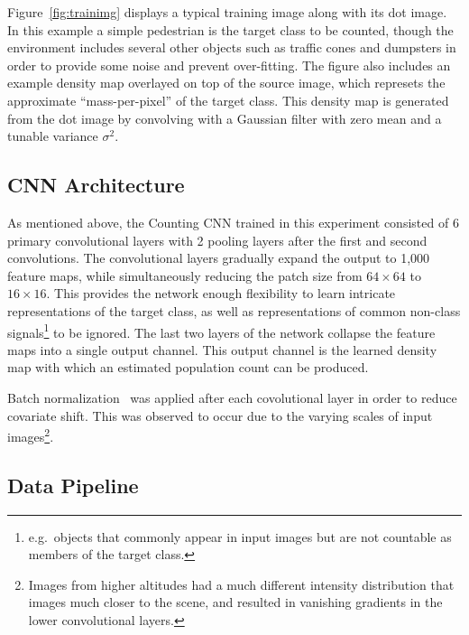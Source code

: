 \documentclass[10pt,twocolumn,letterpaper]{article}
\begin{document}
  Figure~\ref{fig:trainimg} displays a typical training image along with its
  dot image. In this example a simple pedestrian is the target class to be
  counted, though the environment includes several other objects such as
  traffic cones and dumpsters in order to provide some noise and prevent
  over-fitting. The figure also includes an example density map overlayed on
  top of the source image, which represets the approximate ``mass-per-pixel''
  of the target class. This density map is generated from the dot image by
  convolving with a Gaussian filter with zero mean and a tunable variance
  $\sigma^2$.


\subsection{CNN Architecture}

  As mentioned above, the Counting CNN trained in this experiment consisted of
  6 primary convolutional layers with 2 pooling layers after the first and
  second convolutions. The convolutional layers gradually expand the output to
  1,000 feature maps, while simultaneously reducing the patch size from $64
  \times 64$ to $16 \times 16$. This provides the network enough flexibility to
  learn intricate representations of the target class, as well as
  representations of common non-class signals\footnote{ e.g.\ objects that
  commonly appear in input images but are not countable as members of the
  target class.} to be ignored. The last two layers of the network collapse the
  feature maps into a single output channel. This output channel is the learned
  density map with which an estimated population count can be produced.

  Batch normalization~\cite{ioffeS15} was applied after each covolutional layer
  in order to reduce covariate shift. This was observed to occur due to the
  varying scales of input images\footnote{Images from higher altitudes
  had a much different intensity distribution that images much closer to the
  scene, and resulted in vanishing gradients in the lower convolutional
  layers.}.


\subsection{Data Pipeline}
\end{document}
